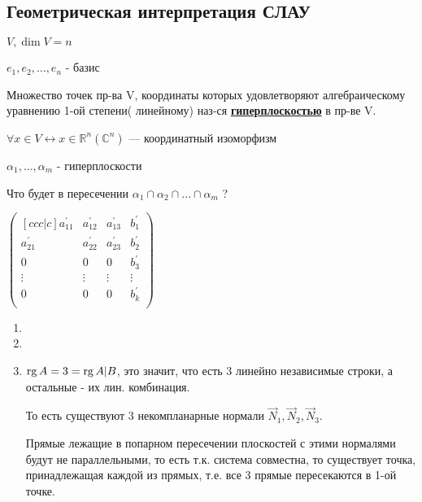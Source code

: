 \subsection{Геометрическая интерпретация СЛАУ}

\(V, \dim V = n\)

\(e_1,e_2,\ldots, e_n\) - базис

Множество точек пр-ва V, координаты которых удовлетворяют алгебраическому уравнению 1-ой степени( линейному) наз-ся \uline{\textbf{гиперплоскостью}} в пр-ве V.

$\forall x \in V \leftrightarrow x \in \mathbb{R}^n(\mathbb{C}^n)$ --- координатный изоморфизм

$\alpha_1,\ldots,\alpha_m$ - гиперплоскости

Что будет в пересечении $\alpha_1 \cap \alpha_2 \cap \ldots \cap \alpha_m$ ?



\(
\begin{pmatrix}[ccc|c]
    a_{11}^{\prime} & a_{12}^{\prime} & a_{13}^{\prime} & b_{1}^{\prime} \\
    a_{21}^{\prime} & a_{22}^{\prime} & a_{23}^{\prime} & b_{2}^{\prime} \\
    0               & 0               & 0               & b_{3}^{\prime} \\
    \vdots          & \vdots          & \vdots          & \vdots         \\
    0               & 0               & 0               & b_{k}^{\prime} \\
\end{pmatrix}
\)

\begin{enumerate}
    \item
    \item
    \item \(\operatorname{rg} A = 3 = \operatorname{rg} A | B\), это значит, что есть 3 линейно независимые строки, а остальные - их лин. комбинация.

          То есть существуют 3 некомпланарные нормали \(\vec N_1, \vec N_2, \vec N_3\).

          Прямые лежащие в попарном пересечении плоскостей с этими нормалями будут не параллельными, то есть т.к. система совместна, то существует точка, принадлежащая каждой из прямых, т.е. все 3 прямые пересекаются в 1-ой точке.
\end{enumerate}

